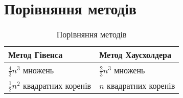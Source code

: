 \documentclass[serif,12pt,unicode]{beamer}
\begin{document}
\section{Порівняння методів}
\begin{frame}
	\begin{table}
	\caption{Порівняння методів}
	\begin{center}
	\begin{tabular}{|l|l|}
		\hline
		Метод Гівенса & Метод Хаусхолдера \\
		\hline
		$\frac{4}{3} n^3$ множень & $\frac{2}{3} n^3$ множень\\
		\hline
		$\frac{1}{2} n^2$ квадратних коренів & $n$ квадратних коренів\\
		\hline
	\end{tabular}
	\end{center}
	\end{table}
\end{frame}
\end{document}
